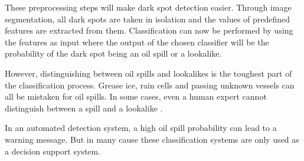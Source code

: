 These preprocessing steps will make dark spot detection easier. Through image segmentation, all dark spots are taken in isolation and the values of predefined features are extracted from them. Classification can now be performed by using the features as input where the output of the chosen classifier will be the probability of the dark spot being an oil spill or a lookalike. %

However, distinguishing between oil spills and lookalikes is the toughest part of the classification process. Grease ice, rain cells and passing unknown vessels can all be mistaken for oil spills\cite{Brekke200595}. In some cases, even a human expert cannot distinguish between a spill and a lookalike \cite{Keramitsoglou2006640}.

In an automated detection system, a high oil spill probability can lead to a warning message. But in many cause these classification systems are only used as a decision support system. %



